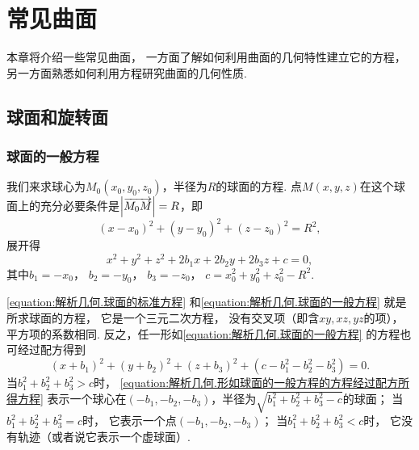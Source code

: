 \section{常见曲面}
本章将介绍一些常见曲面，
一方面了解如何利用曲面的几何特性建立它的方程，
另一方面熟悉如何利用方程研究曲面的几何性质.

\subsection{球面和旋转面}
\subsubsection{球面的一般方程}
我们来求球心为\(M_0(x_0,y_0,z_0)\)，半径为\(R\)的球面的方程.
点\(M(x,y,z)\)在这个球面上的充分必要条件是\(\abs{\overrightarrow{M_0 M}} = R\)，即
\begin{equation}\label{equation:解析几何.球面的标准方程}
	(x-x_0)^2+(y-y_0)^2+(z-z_0)^2=R^2,
\end{equation}
展开得
\begin{equation}\label{equation:解析几何.球面的一般方程}
	x^2 + y^2 + z^2 + 2 b_1 x + 2 b_2 y + 2 b_3 z + c = 0,
\end{equation}
其中\(b_1 = -x_0\)，
\(b_2 = -y_0\)，
\(b_3 = -z_0\)，
\(c = x_0^2 + y_0^2 + z_0^2 - R^2\).

\cref{equation:解析几何.球面的标准方程}
和\cref{equation:解析几何.球面的一般方程}
就是所求球面的方程，
它是一个三元二次方程，
没有交叉项（即含\(xy,xz,yz\)的项），
平方项的系数相同.
反之，任一形如\cref{equation:解析几何.球面的一般方程} 的方程也可经过配方得到
\begin{equation}\label{equation:解析几何.形如球面的一般方程的方程经过配方所得方程}
	(x+b_1)^2 + (y+b_2)^2 + (z+b_3)^2 + (c-b_1^2-b_2^2-b_3^2) = 0.
\end{equation}
当\(b_1^2+b_2^2+b_3^2>c\)时，
\cref{equation:解析几何.形如球面的一般方程的方程经过配方所得方程}
表示一个球心在\((-b_1,-b_2,-b_3)\)，半径为\(\sqrt{b_1^2+b_2^2+b_3^2-c}\)的球面；
当\(b_1^2+b_2^2+b_3^2=c\)时，
它表示一个点\((-b_1,-b_2,-b_3)\)；
当\(b_1^2+b_2^2+b_3^2<c\)时，
它没有轨迹（或者说它表示一个虚球面）.

